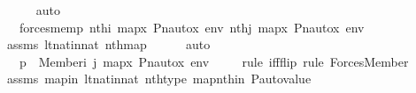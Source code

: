 \begin{isabellebody}
\ \ \ \ \isamarkupfalse%
\ auto\isanewline
\ \ \isamarkupfalse%
\ \isamarkupfalse%
\ {\isachardoublequoteopen}{\isachardot}{\kern0pt}{\isachardot}{\kern0pt}{\isachardot}{\kern0pt}\ {\isasymlongleftrightarrow}\ forces{\isacharunderscore}{\kern0pt}mem{\isacharparenleft}{\kern0pt}{\isasympi}{\isacharbackquote}{\kern0pt}p{\isacharcomma}{\kern0pt}\ nth{\isacharparenleft}{\kern0pt}i{\isacharcomma}{\kern0pt}\ map{\isacharparenleft}{\kern0pt}{\isasymlambda}x{\isachardot}{\kern0pt}\ Pn{\isacharunderscore}{\kern0pt}auto{\isacharparenleft}{\kern0pt}{\isasympi}{\isacharparenright}{\kern0pt}{\isacharbackquote}{\kern0pt}x{\isacharcomma}{\kern0pt}\ env{\isacharparenright}{\kern0pt}{\isacharparenright}{\kern0pt}{\isacharcomma}{\kern0pt}\ nth{\isacharparenleft}{\kern0pt}j{\isacharcomma}{\kern0pt}\ map{\isacharparenleft}{\kern0pt}{\isasymlambda}x{\isachardot}{\kern0pt}\ Pn{\isacharunderscore}{\kern0pt}auto{\isacharparenleft}{\kern0pt}{\isasympi}{\isacharparenright}{\kern0pt}{\isacharbackquote}{\kern0pt}x{\isacharcomma}{\kern0pt}\ env{\isacharparenright}{\kern0pt}{\isacharparenright}{\kern0pt}{\isacharparenright}{\kern0pt}{\isachardoublequoteclose}\ \isanewline
\ \ \ \ \isamarkupfalse%
\ assms\ lt{\isacharunderscore}{\kern0pt}nat{\isacharunderscore}{\kern0pt}in{\isacharunderscore}{\kern0pt}nat\ nth{\isacharunderscore}{\kern0pt}map\isanewline
\ \ \ \ \isamarkupfalse%
\ auto\isanewline
\ \ \isamarkupfalse%
\ \isamarkupfalse%
\ {\isachardoublequoteopen}{\isachardot}{\kern0pt}{\isachardot}{\kern0pt}{\isachardot}{\kern0pt}\ {\isasymlongleftrightarrow}\ {\isasympi}{\isacharbackquote}{\kern0pt}p\ {\isasymtturnstile}\ Member{\isacharparenleft}{\kern0pt}i{\isacharcomma}{\kern0pt}\ j{\isacharparenright}{\kern0pt}\ map{\isacharparenleft}{\kern0pt}{\isasymlambda}x{\isachardot}{\kern0pt}\ Pn{\isacharunderscore}{\kern0pt}auto{\isacharparenleft}{\kern0pt}{\isasympi}{\isacharparenright}{\kern0pt}{\isacharbackquote}{\kern0pt}x{\isacharcomma}{\kern0pt}\ env{\isacharparenright}{\kern0pt}{\isachardoublequoteclose}\isanewline
\ \ \ \ \isamarkupfalse%
{\isacharparenleft}{\kern0pt}rule\ iff{\isacharunderscore}{\kern0pt}flip{\isacharcomma}{\kern0pt}\ rule\ Forces{\isacharunderscore}{\kern0pt}Member{\isacharparenright}{\kern0pt}\isanewline
\ \ \ \ \isamarkupfalse%
\ assms\ mapin\ lt{\isacharunderscore}{\kern0pt}nat{\isacharunderscore}{\kern0pt}in{\isacharunderscore}{\kern0pt}nat\ nth{\isacharunderscore}{\kern0pt}type\ mapnthin\ P{\isacharunderscore}{\kern0pt}auto{\isacharunderscore}{\kern0pt}value\isanewline

\end{isabellebody}
